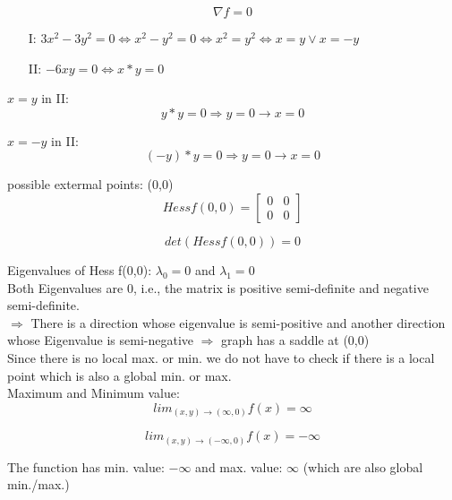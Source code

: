 \documentclass[12pt]{article}
\begin{document}
        $$ \nabla f = 0 $$
         
        \begin{enumerate}
         	\item[I:] $ 3x^2-3y^2=0 \Leftrightarrow x^2-y^2=0 \Leftrightarrow x^2=y^2 \Leftrightarrow x=y \vee x=-y $
         	\item[II:] $ -6xy=0 \Leftrightarrow x*y=0 $
        \end{enumerate}
        
        $x=y$ in II:\\
        $$ y*y = 0 \Rightarrow y = 0 \rightarrow x = 0 $$
        
		$x=-y$ in II:\\
        $$ (-y)*y = 0 \Rightarrow y = 0 \rightarrow x = 0 $$
        
        possible extermal points: (0,0)\\
        
        $$ Hess f(0,0) = \begin{bmatrix} 0 & 0 \\ 0 & 0 \end{bmatrix} $$
        
        $$ det (Hess f(0,0)) = 0 $$
        
        Eigenvalues of Hess f(0,0): $\lambda_0=0$ and $\lambda_1=0$\\
        
        Both Eigenvalues are 0, i.e., the matrix is positive semi-definite and negative semi-definite. \\
        
        $\Rightarrow$ There is a direction whose eigenvalue is semi-positive and another direction whose Eigenvalue is semi-negative $\Rightarrow$ graph has a saddle at (0,0)\\
        
        Since there is no local max. or min. we do not have to check if there is a local point which is also a global min. or max.\\
        
        Maximum and Minimum value:\\
        
        $$ lim_{(x,y)\rightarrow (\infty,0)}f(x)= \infty $$
        
        $$ lim_{(x,y)\rightarrow (-\infty,0)}f(x)= -\infty $$
        
        The function has min. value: $-\infty$ and max. value: $\infty$ (which are also global min./max.)
        
        
        
\end{document}
